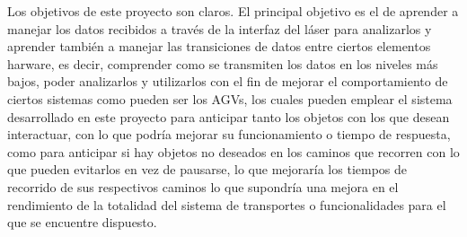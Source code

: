 
Los objetivos de este proyecto son claros. El principal objetivo es el de aprender a manejar los datos recibidos a través de la interfaz del láser para analizarlos y aprender también a manejar las transiciones de datos entre ciertos elementos harware, es decir, comprender como se transmiten los datos en los niveles más bajos, poder analizarlos y utilizarlos con el fin de mejorar el comportamiento de ciertos sistemas como pueden ser los AGVs, los cuales pueden emplear el sistema desarrollado en este proyecto para anticipar tanto los objetos con los que desean interactuar, con lo que podría mejorar su funcionamiento o tiempo de respuesta, como para anticipar si hay objetos no deseados en los caminos que recorren con lo que pueden evitarlos en vez de pausarse, lo que mejoraría los tiempos de recorrido de sus respectivos caminos lo que supondría una mejora en el rendimiento de la totalidad del sistema de transportes o funcionalidades para el que se encuentre dispuesto.
